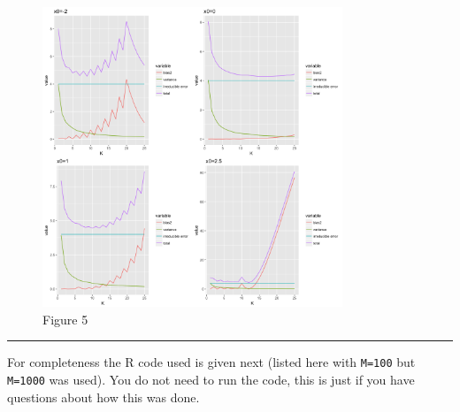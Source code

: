 \documentclass[]{article}
\begin{document}
\begin{figure}
\centering
\includegraphics[width=0.80000\textwidth]{Prob1f5.png}
\caption{Figure 5}
\end{figure}

\begin{center}\rule{0.5\linewidth}{\linethickness}\end{center}

For completeness the R code used is given next (listed here with
\texttt{M=100} but \texttt{M=1000} was used). You do not need to run the
code, this is just if you have questions about how this was done.

\footnotesize
\end{document}
